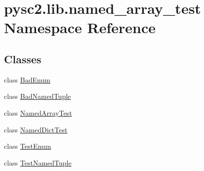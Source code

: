 \hypertarget{namespacepysc2_1_1lib_1_1named__array__test}{}\section{pysc2.\+lib.\+named\+\_\+array\+\_\+test Namespace Reference}
\label{namespacepysc2_1_1lib_1_1named__array__test}
\subsection*{Classes}
\begin{DoxyCompactItemize}
\item 
class \mbox{\hyperlink{classpysc2_1_1lib_1_1named__array__test_1_1_bad_enum}{Bad\+Enum}}
\item 
class \mbox{\hyperlink{classpysc2_1_1lib_1_1named__array__test_1_1_bad_named_tuple}{Bad\+Named\+Tuple}}
\item 
class \mbox{\hyperlink{classpysc2_1_1lib_1_1named__array__test_1_1_named_array_test}{Named\+Array\+Test}}
\item 
class \mbox{\hyperlink{classpysc2_1_1lib_1_1named__array__test_1_1_named_dict_test}{Named\+Dict\+Test}}
\item 
class \mbox{\hyperlink{classpysc2_1_1lib_1_1named__array__test_1_1_test_enum}{Test\+Enum}}
\item 
class \mbox{\hyperlink{classpysc2_1_1lib_1_1named__array__test_1_1_test_named_tuple}{Test\+Named\+Tuple}}
\end{DoxyCompactItemize}
